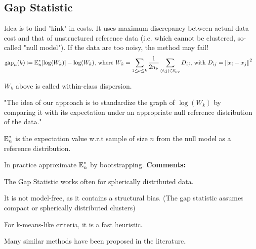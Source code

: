 \documentclass[12pt]{article}
\begin{document}
\subsection{Gap Statistic}
\par Idea is to find "kink" in costs. It uses maximum discrepancy between actual data cost and that of unstructured reference data (i.e. which cannot be clustered, so-called "null model"). If the data are too noisy, the method may fail!
\[ \text{gap}_n(k) \coloneqq \operatorname{\mathbb{E}}_n^*[\log (W_k)] - \log (W_k) \text{, where } W_k = \sum_{1\leq\nu\leq k} \frac{1}{2n_{\nu}} \sum_{(i,j)\in\mathcal{E}_{\nu\nu}} D_{ij} \text{, with } D_{ij}=\left\lVert x_i - x_j\right\rVert^2 \]
\ulb
\item $W_k$ above is called within-class dispersion.
\item "The idea of our approach is to standardize the graph of $\log(W_k)$ by comparing it with its expectation under an appropriate null reference distribution of the data."
\item $\operatorname{\mathbb{E}}_n^*$ is the expectation value w.r.t sample of size $n$ from the null model as a reference distribution.
\item In practice approximate $\operatorname{\mathbb{E}}_n^*$ by bootstrapping.
\ule
\textbf{Comments:}
\ulb
\item The Gap Statistic works often for spherically distributed data.
\item It is not model-free, as it contains a structural bias. (The gap statistic assumes compact or spherically distributed clusters)
\item For k-means-like criteria, it is a fast heuristic.
\item Many similar methods have been proposed in the literature.
\ule
\end{document}

